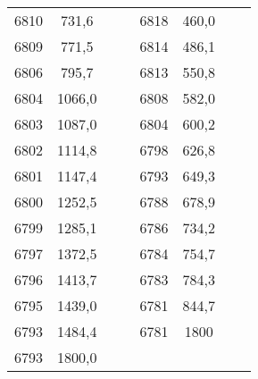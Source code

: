 \documentclass[11pt]{article}
\begin{document}
{{\begin{tabular}{|c|c|c|c|c|c|c|c|}
            \cline{1-2} \cline{5-6} 
            6810 & 731,6 & \multicolumn{1}{c}{} &  & 6818 & 460,0 & \multicolumn{1}{c}{} & \multicolumn{1}{c}{}\tabularnewline
            \cline{1-2} \cline{5-6} 
            6809 & 771,5 & \multicolumn{1}{c}{} &  & 6814 & 486,1 & \multicolumn{1}{c}{} & \multicolumn{1}{c}{}\tabularnewline
            \cline{1-2} \cline{5-6} 
            6806 & 795,7 & \multicolumn{1}{c}{} &  & 6813 & 550,8 & \multicolumn{1}{c}{} & \multicolumn{1}{c}{}\tabularnewline
            \cline{1-2} \cline{5-6} 
            6804 & 1066,0 & \multicolumn{1}{c}{} &  & 6808 & 582,0 & \multicolumn{1}{c}{} & \multicolumn{1}{c}{}\tabularnewline
            \cline{1-2} \cline{5-6} 
            6803 & 1087,0 & \multicolumn{1}{c}{} &  & 6804 & 600,2 & \multicolumn{1}{c}{} & \multicolumn{1}{c}{}\tabularnewline
            \cline{1-2} \cline{5-6} 
            6802 & 1114,8 & \multicolumn{1}{c}{} &  & 6798 & 626,8 & \multicolumn{1}{c}{} & \multicolumn{1}{c}{}\tabularnewline
            \cline{1-2} \cline{5-6} 
            6801 & 1147,4 & \multicolumn{1}{c}{} &  & 6793 & 649,3 & \multicolumn{1}{c}{} & \multicolumn{1}{c}{}\tabularnewline
            \cline{1-2} \cline{5-6} 
            6800 & 1252,5 & \multicolumn{1}{c}{} &  & 6788 & 678,9 & \multicolumn{1}{c}{} & \multicolumn{1}{c}{}\tabularnewline
            \cline{1-2} \cline{5-6} 
            6799 & 1285,1 & \multicolumn{1}{c}{} &  & 6786 & 734,2 & \multicolumn{1}{c}{} & \multicolumn{1}{c}{}\tabularnewline
            \cline{1-2} \cline{5-6} 
            6797 & 1372,5 & \multicolumn{1}{c}{} &  & 6784 & 754,7 & \multicolumn{1}{c}{} & \multicolumn{1}{c}{}\tabularnewline
            \cline{1-2} \cline{5-6} 
            6796 & 1413,7 & \multicolumn{1}{c}{} &  & 6783 & 784,3 & \multicolumn{1}{c}{} & \multicolumn{1}{c}{}\tabularnewline
            \cline{1-2} \cline{5-6} 
            6795 & 1439,0 & \multicolumn{1}{c}{} &  & 6781 & 844,7 & \multicolumn{1}{c}{} & \multicolumn{1}{c}{}\tabularnewline
            \cline{1-2} \cline{5-6} 
            6793 & 1484,4 & \multicolumn{1}{c}{} &  & 6781 & 1800 & \multicolumn{1}{c}{} & \multicolumn{1}{c}{}\tabularnewline
            \cline{1-2} \cline{5-6} 
            6793 & 1800,0 & \multicolumn{1}{c}{} & \multicolumn{1}{c}{} & \multicolumn{1}{c}{} & \multicolumn{1}{c}{} & \multicolumn{1}{c}{} & \multicolumn{1}{c}{}\tabularnewline
            \cline{1-2} 
        \end{tabular}
    }
}
\vspace*{\fill}\vspace*{\fill}
\end{document}
